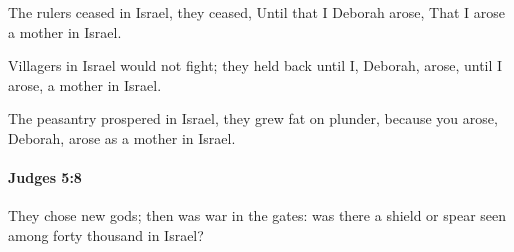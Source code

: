 			\begin{versebox}
					\item[BHS] 
					\item[ASV] The rulers ceased in Israel, they ceased, Until that I Deborah arose, That I arose a mother in Israel.
					\item[NIV] Villagers in Israel would not fight; they held back until I, Deborah, arose, until I arose, a mother in Israel.
					\item[NRSV] The peasantry prospered in Israel, they grew fat on plunder, because you arose, Deborah, arose as a mother in Israel.
			\end{versebox}

		\paragraph{Judges 5:8} %
			\label{JUDGES-5-8}

			They chose new gods; then was war in the gates: was there a shield or spear seen among forty thousand in Israel?

